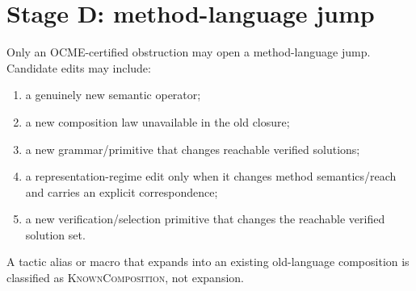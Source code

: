 \section{Stage D: method-language jump}
Only an OCME-certified obstruction may open a method-language jump. Candidate edits may include:
\begin{enumerate}
    \item a genuinely new semantic operator;
    \item a new composition law unavailable in the old closure;
    \item a new grammar/primitive that changes reachable verified solutions;
    \item a representation-regime edit only when it changes method semantics/reach and carries an explicit correspondence;
    \item a new verification/selection primitive that changes the reachable verified solution set.
\end{enumerate}
A tactic alias or macro that expands into an existing old-language composition is classified as \textsc{KnownComposition}, not expansion.

